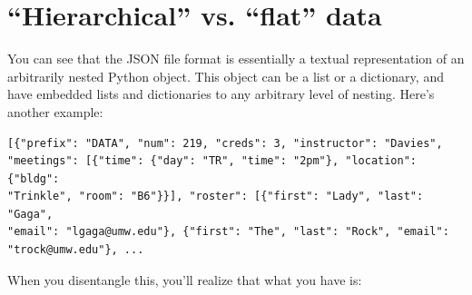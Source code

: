 \section{``Hierarchical'' vs. ``flat'' data}

You can see that the JSON file format is essentially a textual representation
of an arbitrarily nested Python object. This object can be a list or a
dictionary, and have embedded lists and dictionaries to any arbitrary level of
nesting. Here's another example:

\begin{Verbatim}[fontsize=\small,samepage=true,frame=none]
[{"prefix": "DATA", "num": 219, "creds": 3, "instructor": "Davies",
"meetings": [{"time": {"day": "TR", "time": "2pm"}, "location": {"bldg":
"Trinkle", "room": "B6"}}], "roster": [{"first": "Lady", "last": "Gaga",
"email": "lgaga@umw.edu"}, {"first": "The", "last": "Rock", "email":
"trock@umw.edu"}, ...
\end{Verbatim}

When you disentangle this, you'll realize that what you have is:

\vspace{.2in}

